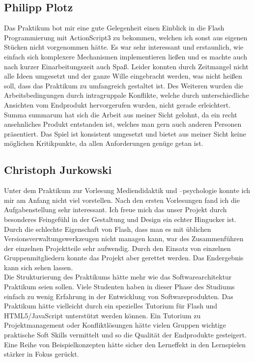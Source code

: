 \documentclass[a4paper, 11pt]{article} %
\begin{document}
\subsection{Philipp Plotz}
Das Praktikum bot mir eine gute Gelegenheit einen Einblick in die Flash Programmierung mit ActionScript3 zu bekommen, welchen ich sonst aus eigenen Stücken nicht vorgenommen hätte. Es war sehr interessant und erstaunlich, wie einfach sich komplexere Mechanismen implementieren ließen und es machte auch nach kurzer Einarbeitungszeit auch Spaß. Leider konnten durch Zeitmangel nicht alle Ideen umgesetzt und der ganze Wille eingebracht werden, was nicht heißen soll, dass das Praktikum zu umfangreich gestaltet ist. Des Weiteren wurden die Arbeitsbedingungen durch intragruppale Konflikte, welche durch unterschiedliche Ansichten vom Endprodukt hervorgerufen wurden, nicht gerade erleichtert. Summa summarum hat sich die Arbeit aus meiner Sicht gelohnt, da ein recht ansehnliches Produkt entstanden ist, welches man gern auch anderen Personen präsentiert. Das Spiel ist konsistent umgesetzt und bietet aus meiner Sicht keine möglichen Kritikpunkte, da allen Anforderungen genüge getan ist.

\subsection{Christoph Jurkowski}
Unter dem Praktikum zur Vorlesung Mediendidaktik und –psychologie konnte ich mir am Anfang nicht viel vorstellen. Nach den ersten Vorlesungen fand ich die Aufgabenstellung sehr interessant. Ich freue mich das unser Projekt durch besonderes Feingefühl in der Gestaltung und Design ein echter Hingucker ist. Durch die schlechte Eigenschaft von Flash, dass man es mit üblichen Versionsverwaltungswerkzeugen nicht managen kann, war des Zusammenführen der einzelnen Projektteile sehr aufwendig. Durch den Einsatz von einzelnen Gruppenmitgliedern konnte das Projekt aber gerettet werden. Das Endergebnis kann sich sehen lassen. \\
Die Strukturierung des Praktikums hätte mehr wie das Softwarearchitektur Praktikum seien sollen. Viele Studenten haben in dieser Phase des Studiums einfach zu wenig Erfahrung in der Entwicklung von Softwareprodukten. Das Praktikum hätte vielleicht durch ein spezielles Tutorium für Flash und HTML5/JavaScript unterstützt werden können. Ein Tutorium zu Projektmanagement oder Konfliktlösungen hätte vielen Gruppen wichtige praktische Soft Skills vermittelt und so die Qualität der Endprodukte gesteigert. Eine Reihe von Beispielkonzepten hätte sicher den Lerneffekt in den Lernspielen stärker in Fokus gerückt.
\end{document}
